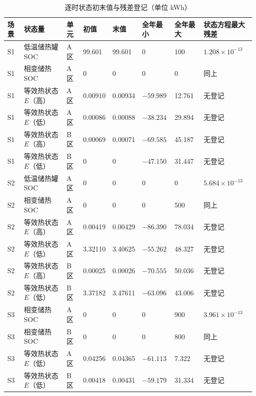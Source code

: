\documentclass[12pt,a4paper]{article}
\begin{document}
\begin{table}[H]
\centering
\caption{逐时状态初末值与残差登记（单位 kWh）}
\label{tab:alg-annex-b2}
\footnotesize
\begin{tabularx}{\textwidth}{@{}p{}p{}p{}p{}p{}p{}p{}X@{}}
\toprule
场景 & 状态量 & 单元 & 初值 & 末值 & 全年最小 & 全年最大 & 状态方程最大残差\\ \midrule
S1 & 低温储热罐 SOC & A 区 &99.601 & 99.601 & 0 & 100 & $1.208\times10^{-13}$\\ \addlinespace
S1 & 相变储热 SOC & A 区 &0 & 0 & 0 & 0 & 同上\\ \addlinespace
S1 & 等效热状态 $E$（高） & A 区 &0.00910 & 0.00934 & $-59.989$ & 12.761 & 无登记\\ \addlinespace
S1 & 等效热状态 $E$（低） & A 区 &0.00086 & 0.00088 & $-38.234$ & 29.894 & 无登记\\ \addlinespace
S1 & 等效热状态 $E$（高） & B 区 &0.00069 & 0.00071 & $-69.585$ & 45.187 & 无登记\\ \addlinespace
S1 & 等效热状态 $E$（低） & B 区 &0 & 0 & $-47.150$ & 31.447 & 无登记\\ \addlinespace
S2 & 低温储热罐 SOC & A 区 &0 & 0 & 0 & 0 & $5.684\times10^{-13}$\\ \addlinespace
S2 & 相变储热 SOC & A 区 &0 & 0 & 0 & 500 & 同上\\ \addlinespace
S2 & 等效热状态 $E$（高） & A 区 &0.00419 & 0.00429 & $-86.390$ & 78.034 & 无登记\\ \addlinespace
S2 & 等效热状态 $E$（低） & A 区 &3.32110 & 3.40625 & $-55.262$ & 48.327 & 无登记\\ \addlinespace
S2 & 等效热状态 $E$（高） & B 区 &0.00025 & 0.00026 & $-70.555$ & 50.036 & 无登记\\ \addlinespace
S2 & 等效热状态 $E$（低） & B 区 &3.37182 & 3.47611 & $-63.096$ & 43.006 & 无登记\\ \addlinespace
S3 & 相变储热 SOC & A 区 &0 & 0 & 0 & 900 & $3.961\times10^{-13}$\\ \addlinespace
S3 & 相变储热 SOC & B 区 &0 & 0 & 0 & 800 & 同上\\ \addlinespace
S3 & 等效热状态 $E$（低） & A 区 &0.04256 & 0.04365 & $-61.113$ & 7.322 & 无登记\\ \addlinespace
S3 & 等效热状态 $E$（低） & B 区 &0.00418 & 0.00431 & $-59.179$ & 31.334 & 无登记\\ \bottomrule
\end{tabularx}
\end{table}
\end{document}
